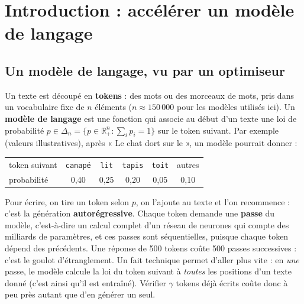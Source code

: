 \documentclass[11pt,a4paper]{article}
\newcommand{\R}{\mathbb{R}}
\newcommand{\tok}[1]{\texttt{#1}}
\theoremstyle{plain}
\begin{document}
\section{Introduction : accélérer un modèle de langage}\label{sec:contexte}
\subsection{Un modèle de langage, vu par un optimiseur}\label{sec:llm}
Un texte est découpé en \textbf{tokens} : des mots ou des morceaux de mots, pris dans un vocabulaire fixe de $n$ éléments ($n\approx150\,000$ pour les modèles utilisés ici).
Un \textbf{modèle de langage} est une fonction qui associe au début d'un texte une loi de probabilité $p\in\Delta_n=\{p\in\R_+^n:\sum_ip_i=1\}$ sur le token suivant.
Par exemple (valeurs illustratives), après « Le chat dort sur le », un modèle pourrait donner :
\begin{center}\small
\begin{tabular}{@{}lccccc@{}}
\toprule
token suivant & \tok{canapé} & \tok{lit} & \tok{tapis} & \tok{toit} & autres\\
probabilité & 0,40 & 0,25 & 0,20 & 0,05 & 0,10\\
\bottomrule
\end{tabular}
\end{center}
Pour écrire, on tire un token selon $p$, on l'ajoute au texte et l'on recommence : c'est la génération \textbf{autorégressive}.
Chaque token demande une \textbf{passe} du modèle, c'est-à-dire un calcul complet d'un réseau de neurones qui compte des milliards de paramètres, et ces passes sont séquentielles, puisque chaque token dépend des précédents.
Une réponse de 500 tokens coûte 500 passes successives : c'est le goulot d'étranglement.
Un fait technique permet d'aller plus vite : en \emph{une} passe, le modèle calcule la loi du token suivant à \emph{toutes} les positions d'un texte donné (c'est ainsi qu'il est entraîné). Vérifier $\gamma$ tokens déjà écrits coûte donc à peu près autant que d'en générer un seul.
\end{document}
